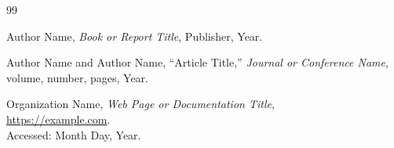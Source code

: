\begin{thebibliography}{99}
{}

Author Name, \textit{Book or Report Title}, Publisher, Year.

Author Name and Author Name, ``Article Title,'' \textit{Journal or Conference Name}, volume, number, pages, Year.

Organization Name, \textit{Web Page or Documentation Title},\\
\url{https://example.com}.\\
Accessed: Month Day, Year.

\end{thebibliography}